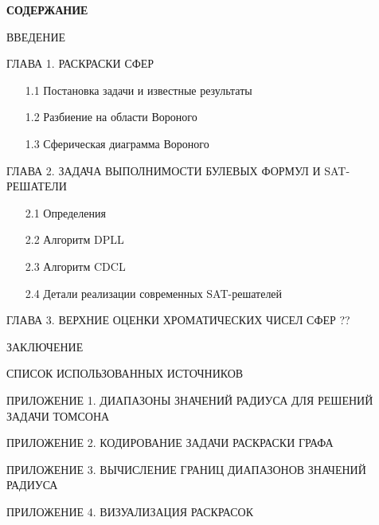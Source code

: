 
\newpage


\begin{center}
\textbf{СОДЕРЖАНИЕ}
\end{center}
\vspace{1.5mm}

\begin{description}

\item{ВВЕДЕНИЕ} \dotfill \pageref{chapters:introduction}

\item{ГЛАВА 1.} РАСКРАСКИ СФЕР \dotfill \pageref{chapters:1}
\begin{enumerate}
\item[1.1] Постановка задачи и известные результаты \dotfill \pageref{chapters:1.1}
\item[1.2] Разбиение на области Вороного \dotfill \pageref{chapters:1.2}
\item[1.3] Сферическая диаграмма Вороного \dotfill \pageref{chapters:1.3}
\end{enumerate}

\item{ГЛАВА 2.} ЗАДАЧА ВЫПОЛНИМОСТИ БУЛЕВЫХ ФОРМУЛ И SAT-РЕШАТЕЛИ \dotfill \pageref{chapters:2}
\begin{enumerate}
\item[2.1] Определения \dotfill \pageref{chapters:2.1}
\item[2.2] Алгоритм DPLL \dotfill \pageref{chapters:2.2}
\item[2.3] Алгоритм CDCL \dotfill \pageref{chapters:2.3}
\item[2.4] Детали реализации современных SAT-решателей \dotfill \pageref{chapters:2.4}
\end{enumerate}


\item{ГЛАВА 3.} ВЕРХНИЕ ОЦЕНКИ ХРОМАТИЧЕСКИХ ЧИСЕЛ СФЕР 
\dotfill ??


\item{ЗАКЛЮЧЕНИЕ} \dotfill \pageref{chapters:conclusions}
\item{СПИСОК ИСПОЛЬЗОВАННЫХ ИСТОЧНИКОВ} \dotfill \pageref{chapters:biblio}

\item{ПРИЛОЖЕНИЕ 1. ДИАПАЗОНЫ ЗНАЧЕНИЙ РАДИУСА ДЛЯ РЕШЕНИЙ ЗАДАЧИ ТОМСОНА} \dotfill \pageref{attachments:1}
\item{ПРИЛОЖЕНИЕ 2. КОДИРОВАНИЕ ЗАДАЧИ РАСКРАСКИ ГРАФА} \dotfill \pageref{attachments:2}
\item{ПРИЛОЖЕНИЕ 3. ВЫЧИСЛЕНИЕ ГРАНИЦ ДИАПАЗОНОВ ЗНАЧЕНИЙ РАДИУСА} \dotfill \pageref{attachments:3}
\item{ПРИЛОЖЕНИЕ 4. ВИЗУАЛИЗАЦИЯ РАСКРАСОК} \dotfill \pageref{attachments:4}


\end{description}
